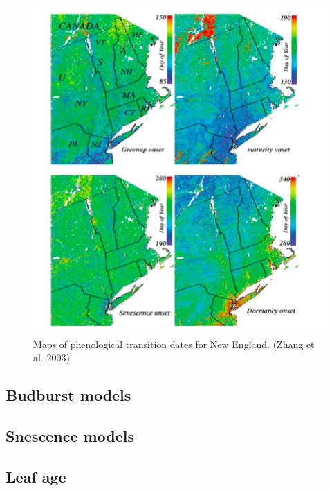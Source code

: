 \documentclass[12pt,oneside]{book}
\begin{document}
\begin{figure}

{\centering \includegraphics[width=0.8\linewidth]{figures/chap4/f45_zhang_map} 

}

\caption{Maps of phenological transition dates for New England. (Zhang et al. 2003)}\label{fig:f45}
\end{figure}

\subsection{Budburst models}\label{budburst-models}

\subsection{Snescence models}\label{snescence-models}

\subsection{Leaf age}\label{leaf-age}
\end{document}
